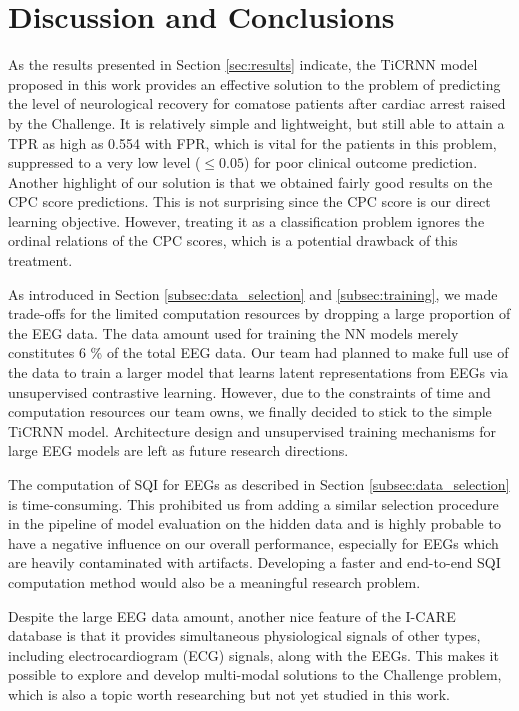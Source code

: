 \section{Discussion and Conclusions}
\label{sec:discu}


As the results presented in Section \ref{sec:results} indicate, the TiCRNN model proposed in this work provides an effective solution to the problem of predicting the level of neurological recovery for comatose patients after cardiac arrest raised by the Challenge. It is relatively simple and lightweight, but still able to attain a TPR as high as 0.554 with FPR, which is vital for the patients in this problem, suppressed to a very low level ($\le 0.05$) for poor clinical outcome prediction. Another highlight of our solution is that we obtained fairly good results on the CPC score predictions. This is not surprising since the CPC score is our direct learning objective. However, treating it as a classification problem ignores the ordinal relations of the CPC scores, which is a potential drawback of this treatment.

As introduced in Section \ref{subsec:data_selection} and \ref{subsec:training}, we made trade-offs for the limited computation resources by dropping a large proportion of the EEG data. The data amount used for training the NN models merely constitutes 6 \% of the total EEG data. Our team had planned to make full use of the data to train a larger model that learns latent representations from EEGs via unsupervised contrastive learning. However, due to the constraints of time and computation resources our team owns, we finally decided to stick to the simple TiCRNN model. Architecture design and unsupervised training mechanisms for large EEG models are left as future research directions.

The computation of SQI for EEGs as described in Section \ref{subsec:data_selection} is time-consuming. This prohibited us from adding a similar selection procedure in the pipeline of model evaluation on the hidden data and is highly probable to have a negative influence on our overall performance, especially for EEGs which are heavily contaminated with artifacts. Developing a faster and end-to-end SQI computation method would also be a meaningful research problem.

Despite the large EEG data amount, another nice feature of the I-CARE database is that it provides simultaneous physiological signals of other types, including electrocardiogram (ECG) signals, along with the EEGs. This makes it possible to explore and develop multi-modal solutions to the Challenge problem, which is also a topic worth researching but not yet studied in this work.
